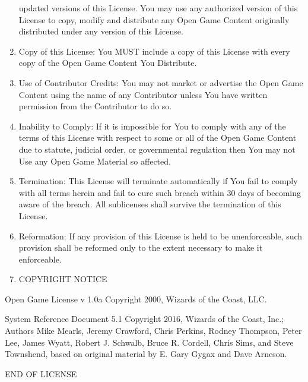 \begin{enumerate}
  updated versions of this License. You may use any authorized version
  of this License to copy, modify and distribute any Open Game Content
  originally distributed under any version of this License.
\item
  Copy of this License: You MUST include a copy of this License with
  every copy of the Open Game Content You Distribute.
\item
  Use of Contributor Credits: You may not market or advertise the Open
  Game Content using the name of any Contributor unless You have written
  permission from the Contributor to do so.
\item
  Inability to Comply: If it is impossible for You to comply with any of
  the terms of this License with respect to some or all of the Open Game
  Content due to statute, judicial order, or governmental regulation
  then You may not Use any Open Game Material so affected.
\item
  Termination: This License will terminate automatically if You fail to
  comply with all terms herein and fail to cure such breach within 30
  days of becoming aware of the breach. All sublicenses shall survive
  the termination of this License.
\item
  Reformation: If any provision of this License is held to be
  unenforceable, such provision shall be reformed only to the extent
  necessary to make it enforceable.
\item
  COPYRIGHT NOTICE
\end{enumerate}

Open Game License v 1.0a Copyright 2000, Wizards of the Coast, LLC.

System Reference Document 5.1 Copyright 2016, Wizards of the Coast,
Inc.; Authors Mike Mearls, Jeremy Crawford, Chris Perkins, Rodney
Thompson, Peter Lee, James Wyatt, Robert J. Schwalb, Bruce R. Cordell,
Chris Sims, and Steve Townshend, based on original material by E. Gary
Gygax and Dave Arneson.

END OF LICENSE
